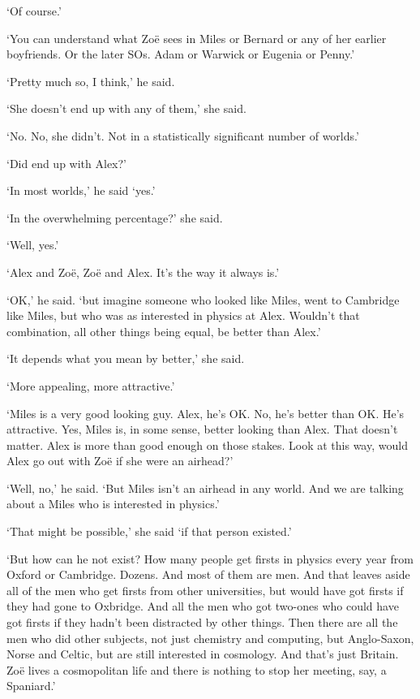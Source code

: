 `Of course.'

`You can understand what Zo{\"e} sees in Miles or Bernard or any
of her earlier boyfriends. Or the later SOs. Adam or Warwick or Eugenia or Penny.'

`Pretty much so, I think,' he said.

`She doesn't end up with any of them,' she said.

`No. No, she didn't. Not in a statistically significant
number of worlds.'

`Did end up with Alex?'

`In most worlds,' he said `yes.'

`In the overwhelming percentage?' she said.

`Well, yes.'

`Alex and Zo{\"e}, Zo{\"e} and Alex. It's the way it
always is.'

`OK,' he said. `but imagine someone who looked like Miles, went to Cambridge
like Miles, but who was as interested in physics at Alex. Wouldn't
that combination, all other things being equal, be better than
Alex.'

`It depends what you mean by better,' she said.

`More appealing, more attractive.'

`Miles is a very good looking guy. Alex, he's OK. No, he's
better than OK. He's attractive. Yes, Miles is, in some sense,
better looking than Alex. That doesn't matter. Alex is more than
good enough on those stakes. Look at this way, would Alex go out
with Zo{\"e} if she were an airhead?'

`Well, no,' he said. `But Miles isn't an airhead in any world. And we are
talking about a Miles who is interested in physics.'

`That might be possible,' she said `if that person existed.'

`But how can he not exist? How many people get firsts in physics every year from Oxford or Cambridge. Dozens. And most of them are men. And that leaves aside all of the men who get firsts from other universities, but would have got firsts if they had gone to Oxbridge. And all the men who got two-ones who could have got firsts if they hadn't been distracted by other things. Then there are all the men who did other subjects, not just chemistry and computing, but Anglo-Saxon, Norse and Celtic, but are still interested in cosmology. And that's just Britain. Zo{\"e} lives a cosmopolitan life and there is nothing to stop her meeting, say, a Spaniard.'

